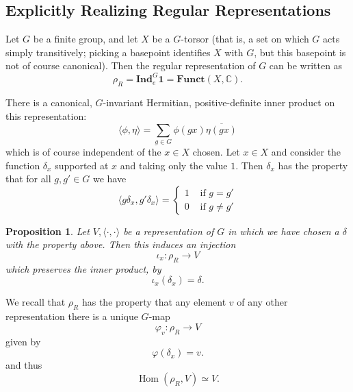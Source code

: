 \documentclass[11pt]{amsart}
\newtheorem{prop}[thm]{Proposition}
\numberwithin{thm}{section}
\begin{document}
\subsection{Explicitly Realizing Regular Representations}
Let $G$ be a finite group, and let $X$ be a $G$-torsor (that is, a set on which $G$ acts simply transitively; picking a basepoint identifies $X$ with $G$, but this basepoint is not of course canonical).  Then the regular representation of $G$ can be written as
\[
\rho_R = \mathbf{Ind}_e^G \mathbf{1} = {\mathbf{Funct}}(X, \mathbb{C}).
\]

There is a canonical, $G$-invariant Hermitian, positive-definite inner product on this representation:
\[
\langle \phi, \eta \rangle = \sum_{g\in G} \phi(gx)\overline{\eta(gx)}
\]
which is of course independent of the $x \in X$ chosen.  Let $x \in X$ and consider the function $\delta_x$ supported at $x$ and taking only the value $1$.  Then $\delta_x$ has the property that for all $g, g' \in G$ we have
\[
\langle g\delta_x, g'\delta_x\rangle = \left\{\begin{array}{ll} 1 & \text{ if } g = g' \\ 0 & \text{ if }g \neq g'\end{array}\right.\] 
\begin{prop}
Let $V, \langle\cdot, \cdot\rangle$ be a representation of $G$ in which we have chosen a $\delta$ with the property above.  Then this induces an injection
\[
\iota_x: \rho_R\rightarrow V
\]
which preserves the inner product, by
\[
\iota_x(\delta_x) = \delta.
\]
\end{prop}
We recall that $\rho_R$ has the property that any element $v$ of any other representation there is a unique $G$-map
\[
\varphi_v: \rho_R\rightarrow V
\]
given by
\[
\varphi(\delta_x) = v.
\]
and thus
\[
{\operatorname{Hom}}(\rho_R, V) \simeq V.
\]
\end{document}
